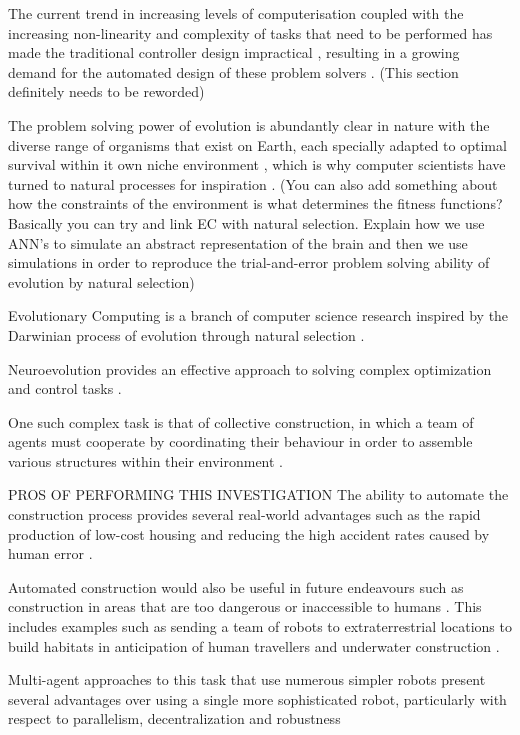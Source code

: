 \documentclass[conference]{IEEEtran}
\begin{document}
The current trend in increasing levels of computerisation coupled with the increasing non-linearity and complexity of tasks that need to be performed has made the traditional controller design impractical \cite{RefWorks:32}, resulting in a growing demand for the automated design of these problem solvers \cite{EibenSmith2003}. (This section definitely needs to be reworded)

The problem solving power of evolution is abundantly clear in nature with the diverse range of organisms that exist on Earth, each specially adapted to optimal survival within it own niche environment \cite{EibenSmith2003}, which is why computer scientists have turned to natural processes for inspiration \cite{RefWorks:32}.
(You can also add something about how the constraints of the environment is what determines the fitness functions? Basically you can try and link EC with natural selection. Explain how we use ANN's to simulate an abstract representation of the brain and then we use simulations in order to reproduce the trial-and-error problem solving ability of evolution by natural selection)

Evolutionary Computing is a branch of computer science research inspired by the Darwinian process of evolution through natural selection \cite{EibenSmith2003}.

Neuroevolution provides an effective approach to solving complex optimization and control tasks \cite{GomezSchmidhuberMiikkulainen2006}.

One such complex task is that of collective construction, in which a team of agents must cooperate by coordinating their behaviour in order to assemble various structures within their environment \cite{Wawerla02collectiveconstruction}.

PROS OF PERFORMING THIS INVESTIGATION
The ability to automate the construction process provides several real-world advantages such as the rapid production of low-cost housing and reducing the high accident rates caused by human error \cite{RefWorks:30}.

Automated construction would also be useful in future endeavours such as construction in areas that are too dangerous or inaccessible to humans \cite{RefWorks:30}. This includes examples such as sending a team of robots to extraterrestrial locations to build habitats in anticipation of human travellers and underwater construction \cite{Wawerla02collectiveconstruction}.

Multi-agent approaches to this task that use numerous simpler robots present several advantages over using a single more sophisticated robot, particularly with respect to parallelism, decentralization and robustness \cite{RefWorks:30} 
\end{document}
